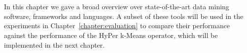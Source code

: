 \\
\\
In this chapter we gave a broad overview over state-of-the-art data mining software, frameworks and languages. A subset of these tools will be used in the experiments in Chapter~\ref{chapter:evaluation} to compare their performance against the performance of the HyPer k-Means operator, which will be implemented in the next chapter.

